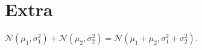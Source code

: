 
\section*{Extra}
$\mathcal{N}(\mu_1,\sigma^2_1)+\mathcal{N}(\mu_2,\sigma^2_2)=\mathcal{N}(\mu_1+\mu_2,\sigma_1^2+\sigma_2^2)$.
